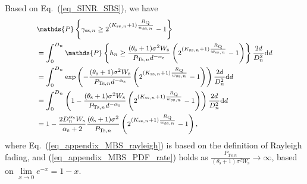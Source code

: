 \documentclass[12pt, draftclsnofoot,onecolumn]{IEEEtran}
\begin{document}
        Based on Eq.~(\ref{eq_SINR_SBS}), we have
        \begin{subequations} \footnotesize
            \label{eq_appendix_MBS_outage_Nm}
            \begin{align}
                & \mathds{P} \left\{\gamma_{\mathrm{ss},n} \geq 2^{(K_{\mathrm{ss},n}+1)\frac{R_\mathrm{Q}}{ w_{\mathrm{ss},n}}} - 1 \right\} \nonumber \\
                &= \int_0^{D_{n}} \mathds{P} \left\{ h_{n} \geq \frac{(\theta_\mathrm{s}+1)\sigma^2 {W_\mathrm{s}} }{P_{\mathrm{Ts},n} d^{-\alpha_\mathrm{s}} } \left(2^{(K_{\mathrm{ss},n}+1) \frac{R_\mathrm{Q}}{w_{\mathrm{ss},n}}} -1 \right)\right\} \frac{2d}{D_{n}^2} \mathrm{d} d  \nonumber \\
                &= \int_0^{D_{n}} \exp\left( -\frac{(\theta_\mathrm{s}+1)\sigma^2 {W_\mathrm{s}} }{P_{\mathrm{Ts},n} d^{-\alpha_\mathrm{s}} } \left(2^{(K_{\mathrm{ss},n}+1) \frac{R_\mathrm{Q}}{w_{\mathrm{ss},n}}} -1 \right)\right) \frac{2d}{D_{n}^2} \mathrm{d} d
                \label{eq_appendix_MBS_rayleigh} \\
                &= \int_0^{D_{n}} \left( 1-\frac{(\theta_\mathrm{s}+1)\sigma^2 {W_\mathrm{s}} }{P_{\mathrm{Ts},n} d^{-\alpha_\mathrm{s}} } \left(2^{(K_{\mathrm{ss},n}+1) \frac{R_\mathrm{Q}}{w_{\mathrm{ss},n}}} -1 \right)\right) \frac{2d}{D_{n}^2} \mathrm{d} d  \label{eq_appendix_MBS_PDF_rate} \\
                &= 1 - \frac{2D_{n}^{\alpha_\mathrm{s}} W_\mathrm{s} }{\alpha_\mathrm{s}+2} \frac{(\theta_\mathrm{s}+1)\sigma^2}{P_{\mathrm{Ts},n}} \left( 2^{(K_{\mathrm{ss},n}+1) \frac{R_\mathrm{Q}}{w_{\mathrm{ss},n}}}-1 \right), \nonumber
            \end{align}
        \end{subequations}
    where Eq.~(\ref{eq_appendix_MBS_rayleigh}) is based on the definition of Rayleigh fading, and (\ref{eq_appendix_MBS_PDF_rate}) holds as $\frac{P_{\mathrm{Ts},n}}{(\theta_\mathrm{s}+1)\sigma^2 W_\mathrm{s}} \rightarrow \infty$, based on $\lim\limits_{x \rightarrow 0} e^{-x}=1-x$.
\end{document}
